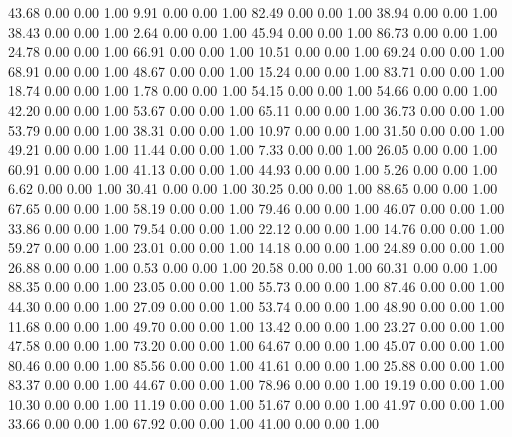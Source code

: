    43.68   0.00   0.00   1.00
    9.91   0.00   0.00   1.00
   82.49   0.00   0.00   1.00
   38.94   0.00   0.00   1.00
   38.43   0.00   0.00   1.00
    2.64   0.00   0.00   1.00
   45.94   0.00   0.00   1.00
   86.73   0.00   0.00   1.00
   24.78   0.00   0.00   1.00
   66.91   0.00   0.00   1.00
   10.51   0.00   0.00   1.00
   69.24   0.00   0.00   1.00
   68.91   0.00   0.00   1.00
   48.67   0.00   0.00   1.00
   15.24   0.00   0.00   1.00
   83.71   0.00   0.00   1.00
   18.74   0.00   0.00   1.00
    1.78   0.00   0.00   1.00
   54.15   0.00   0.00   1.00
   54.66   0.00   0.00   1.00
   42.20   0.00   0.00   1.00
   53.67   0.00   0.00   1.00
   65.11   0.00   0.00   1.00
   36.73   0.00   0.00   1.00
   53.79   0.00   0.00   1.00
   38.31   0.00   0.00   1.00
   10.97   0.00   0.00   1.00
   31.50   0.00   0.00   1.00
   49.21   0.00   0.00   1.00
   11.44   0.00   0.00   1.00
    7.33   0.00   0.00   1.00
   26.05   0.00   0.00   1.00
   60.91   0.00   0.00   1.00
   41.13   0.00   0.00   1.00
   44.93   0.00   0.00   1.00
    5.26   0.00   0.00   1.00
    6.62   0.00   0.00   1.00
   30.41   0.00   0.00   1.00
   30.25   0.00   0.00   1.00
   88.65   0.00   0.00   1.00
   67.65   0.00   0.00   1.00
   58.19   0.00   0.00   1.00
   79.46   0.00   0.00   1.00
   46.07   0.00   0.00   1.00
   33.86   0.00   0.00   1.00
   79.54   0.00   0.00   1.00
   22.12   0.00   0.00   1.00
   14.76   0.00   0.00   1.00
   59.27   0.00   0.00   1.00
   23.01   0.00   0.00   1.00
   14.18   0.00   0.00   1.00
   24.89   0.00   0.00   1.00
   26.88   0.00   0.00   1.00
    0.53   0.00   0.00   1.00
   20.58   0.00   0.00   1.00
   60.31   0.00   0.00   1.00
   88.35   0.00   0.00   1.00
   23.05   0.00   0.00   1.00
   55.73   0.00   0.00   1.00
   87.46   0.00   0.00   1.00
   44.30   0.00   0.00   1.00
   27.09   0.00   0.00   1.00
   53.74   0.00   0.00   1.00
   48.90   0.00   0.00   1.00
   11.68   0.00   0.00   1.00
   49.70   0.00   0.00   1.00
   13.42   0.00   0.00   1.00
   23.27   0.00   0.00   1.00
   47.58   0.00   0.00   1.00
   73.20   0.00   0.00   1.00
   64.67   0.00   0.00   1.00
   45.07   0.00   0.00   1.00
   80.46   0.00   0.00   1.00
   85.56   0.00   0.00   1.00
   41.61   0.00   0.00   1.00
   25.88   0.00   0.00   1.00
   83.37   0.00   0.00   1.00
   44.67   0.00   0.00   1.00
   78.96   0.00   0.00   1.00
   19.19   0.00   0.00   1.00
   10.30   0.00   0.00   1.00
   11.19   0.00   0.00   1.00
   51.67   0.00   0.00   1.00
   41.97   0.00   0.00   1.00
   33.66   0.00   0.00   1.00
   67.92   0.00   0.00   1.00
   41.00   0.00   0.00   1.00
